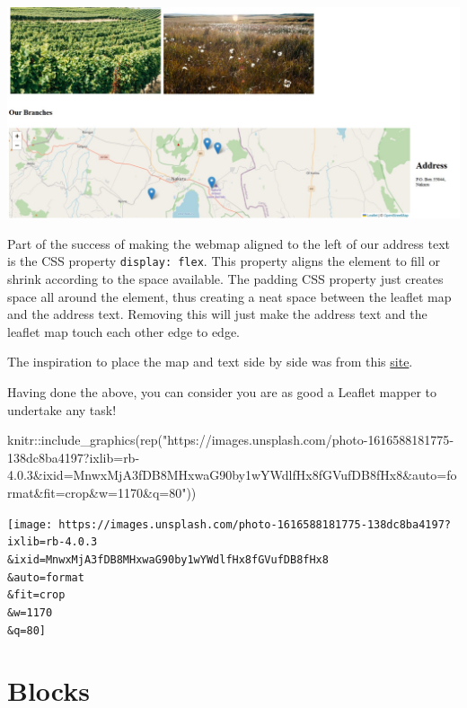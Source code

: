 \documentclass[
]{book}
\newenvironment{Shaded}{\begin{snugshade}}{\end{snugshade}}
\newcommand{\FunctionTok}[1]{\textcolor[rgb]{0.00,0.00,0.00}{#1}}
\newcommand{\NormalTok}[1]{#1}
\newcommand{\SpecialCharTok}[1]{\textcolor[rgb]{0.00,0.00,0.00}{#1}}
\newcommand{\StringTok}[1]{\textcolor[rgb]{0.31,0.60,0.02}{#1}}
\theoremstyle{definition}
\theoremstyle{definition}
\theoremstyle{definition}
\theoremstyle{definition}
\theoremstyle{remark}
\begin{document}
\includegraphics[width=26.21in]{../embedded}

Part of the success of making the webmap aligned to the left of our address text is the CSS property \texttt{display:\ flex}. This property aligns the element to fill or shrink according to the space available. The padding CSS property just creates space all around the element, thus creating a neat space between the leaflet map and the address text. Removing this will just make the address text and the leaflet map touch each other edge to edge.

The inspiration to place the map and text side by side was from this \href{https://www.w3docs.com/snippets/css/how-to-vertically-align-text-next-to-an-image.html?utm_source=pocket_saves}{site}.

Having done the above, you can consider you are as good a Leaflet mapper to undertake any task!

\begin{Shaded}
\begin{Highlighting}[]
\NormalTok{knitr}\SpecialCharTok{::}\FunctionTok{include\_graphics}\NormalTok{(}\FunctionTok{rep}\NormalTok{(}\StringTok{"https://images.unsplash.com/photo{-}1616588181775{-}138dc8ba4197?ixlib=rb{-}4.0.3\&ixid=MnwxMjA3fDB8MHxwaG90by1wYWdlfHx8fGVufDB8fHx8\&auto=format\&fit=crop\&w=1170\&q=80"}\NormalTok{))}
\end{Highlighting}
\end{Shaded}

\texttt{[image: https://images.unsplash.com/photo-1616588181775-138dc8ba4197?ixlib=rb-4.0.3\\\&ixid=MnwxMjA3fDB8MHxwaG90by1wYWdlfHx8fGVufDB8fHx8\\\&auto=format\\\&fit=crop\\\&w=1170\\\&q=80]}

\hypertarget{blocks}{%
\chapter{Blocks}\label{blocks}}
\end{document}
